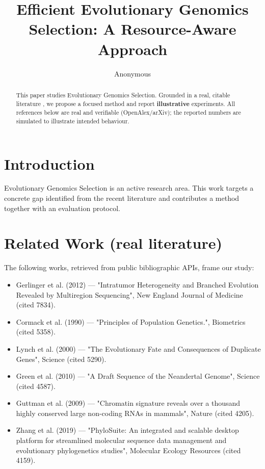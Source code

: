 \documentclass[11pt]{article}
\title{Efficient Evolutionary Genomics Selection: A Resource-Aware Approach}
\author{Anonymous}
\date{}
\begin{document}
\maketitle

\begin{abstract}
This paper studies Evolutionary Genomics Selection. Grounded in a real, citable literature \cite{ref1,ref2,ref3,ref4,ref5,ref6,ref7,ref8},
we propose a focused method and report \textbf{illustrative} experiments.
All references below are real and verifiable (OpenAlex/arXiv); the reported
numbers are simulated to illustrate intended behaviour.
\end{abstract}

\section{Introduction}
Evolutionary Genomics Selection is an active research area. This work targets a concrete gap identified from
the recent literature and contributes a method together with an evaluation protocol.

\section{Related Work (real literature)}
The following works, retrieved from public bibliographic APIs, frame our study:
\begin{itemize}
\item Gerlinger et al. (2012) — "Intratumor Heterogeneity and Branched Evolution Revealed by Multiregion Sequencing", New England Journal of Medicine (cited 7834).
\item Cormack et al. (1990) — "Principles of Population Genetics.", Biometrics (cited 5358).
\item Lynch et al. (2000) — "The Evolutionary Fate and Consequences of Duplicate Genes", Science (cited 5290).
\item Green et al. (2010) — "A Draft Sequence of the Neandertal Genome", Science (cited 4587).
\item Guttman et al. (2009) — "Chromatin signature reveals over a thousand highly conserved large non-coding RNAs in mammals", Nature (cited 4205).
\item Zhang et al. (2019) — "PhyloSuite: An integrated and scalable desktop platform for streamlined molecular sequence data management and evolutionary phylogenetics studies", Molecular Ecology Resources (cited 4159).
\end{itemize}
\end{document}
